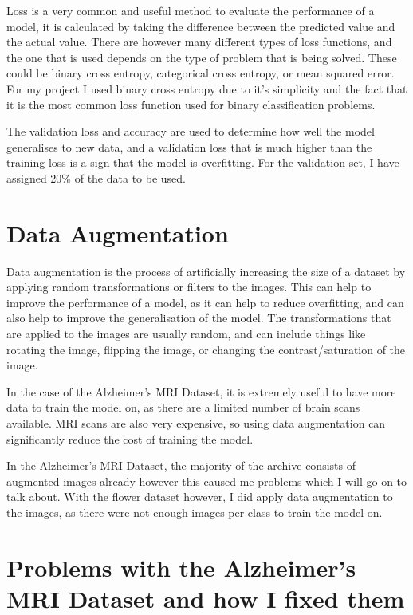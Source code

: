 \documentclass[]{final_report}
\begin{document}
Loss is a very common and useful method to evaluate the performance of a model, it is calculated by taking the difference between the predicted value and the actual value.
There are however many different types of loss functions, and the one that is used depends on the type of problem that is being solved.
These could be binary cross entropy, categorical cross entropy, or mean squared error. For my project I used binary cross entropy due
to it's simplicity and the fact that it is the most common loss function used for binary classification problems.

The validation loss and accuracy are used to determine how well the model generalises to new data, and a validation loss that is much higher than the training loss is a sign that the model is overfitting.
For the validation set, I have assigned 20\% of the data to be used.

\section{Data Augmentation}

Data augmentation is the process of artificially increasing the size of a dataset by applying random transformations or filters to the images.
This can help to improve the performance of a model, as it can help to reduce overfitting, and can also help to improve the generalisation of the model.
The transformations that are applied to the images are usually random, and can include things like rotating the image, 
flipping the image, or changing the contrast/saturation of the image.

In the case of the Alzheimer's MRI Dataset, it is extremely useful to have more data to train the model on, as there are a limited number of brain scans available.
MRI scans are also very expensive, so using data augmentation can significantly reduce the cost of training the model.

In the Alzheimer's MRI Dataset, the majority of the archive consists of augmented images already however this caused me problems which I will go on to talk about.
With the flower dataset however, I did apply data augmentation to the images, as there were not enough images per class to train the model on.

\section{Problems with the Alzheimer's MRI Dataset and how I fixed them}
\end{document}
